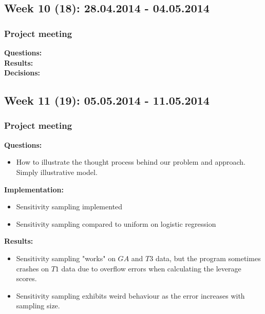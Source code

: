 \documentclass[11pt, a4paper]{article} %
\begin{document}



\subsection*{Week 10 (18): 28.04.2014 - 04.05.2014}
\subsubsection*{Project meeting}
\textbf{Questions:}\\


\textbf{Results:}\\

\textbf{Decisions:}\\




\subsection*{Week 11 (19): 05.05.2014 - 11.05.2014}
\subsubsection*{Project meeting}
\textbf{Questions:}\\
\begin{itemize}
\item How to illustrate the thought process behind our problem and  approach. Simply illustrative model.
\end{itemize}

\textbf{Implementation:}\\
\begin{itemize}
\item Sensitivity sampling implemented
\item Sensitivity sampling compared to uniform on logistic regression
\end{itemize}

\textbf{Results:}\\
\begin{itemize}
\item Sensitivity sampling "works" on $GA$ and $T3$ data, but the program sometimes crashes on $T1$ data due to overflow errors when calculating the leverage scores.
\item Sensitivity sampling exhibits weird behaviour as the error increases with sampling size.
\end{itemize}
\end{document}
